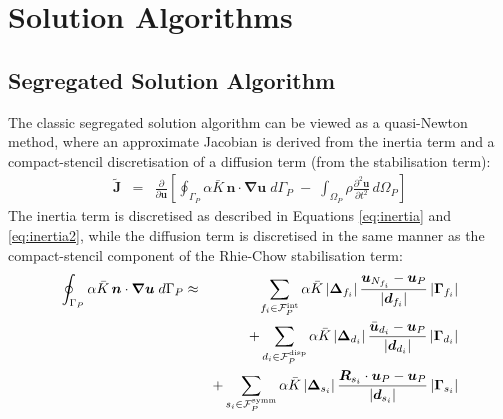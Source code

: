 \documentclass[sn-mathphys,Numbered]{sn-jnl}%
\newcommand{\bb}{\boldsymbol}
\begin{document}
\section{Solution Algorithms}\label{sec:sol_alg}


\subsection{Segregated Solution Algorithm} 
\label{sec:seg_alg}
The classic segregated solution algorithm can be viewed as a quasi-Newton method, where an approximate Jacobian is derived from the inertia term and a compact-stencil discretisation of a diffusion term (from the stabilisation term):
\begin{eqnarray} \label{eq:diffusion}
	\tilde{\bb{J}} &=& \frac{\partial}{\partial \bb{u}} \left[ \oint_{\Gamma_P} \alpha \bar{K} \, \bb{n} \cdot \bb{\nabla} \bb{u} \; d\Gamma_P
	 \; -\;  \int_{\Omega_P} \rho \frac{\partial^2 \bb{u} }{\partial t^2} \, d\Omega_P \right]
\end{eqnarray}
The inertia term is discretised as described in Equations \ref{eq:inertia} and \ref{eq:inertia2}, while the diffusion term is discretised in the same manner as the compact-stencil component of the Rhie-Chow stabilisation term:
\begin{eqnarray}
	\oint_{\Gamma_P} \alpha \bar{K} \, \bb{n} \cdot \bb{\nabla} \bb{u} \; d\Gamma_P &\approx&
		\sum_{f_i \in \mathcal{F}^{\text{int}}_P}  \alpha \bar{K}
		\left|\bb{\Delta}_{f_i} \right| \frac{ \bb{u}_{N_{f_i}} - \bb{u}_P}{\left|\bb{d}_{f_i}\right|}    \left|\bb{\Gamma}_{f_i}\right| \notag \\
	&&+  \sum_{d_i \in \mathcal{F}^{\text{disp}}_P}  \alpha \bar{K}
		\left|\bb{\Delta}_{d_i} \right| \frac{ \bar{\bb{u}}_{d_i}  - \bb{u}_P}{\left|\bb{d}_{d_i}\right|} 
		\left|\bb{\Gamma}_{d_i}\right| \notag \\
	&&+ \sum_{s_i \in \mathcal{F}^{\text{symm}}_P}  \alpha \bar{K}
		\left|\bb{\Delta}_{s_i} \right| \frac{ \bb{R}_{s_i} \cdot \bb{u}_{P} - \bb{u}_P}{\left|\bb{d}_{s_i}\right|}
		\left|\bb{\Gamma}_{s_i}\right|
\end{eqnarray}
\end{document}
